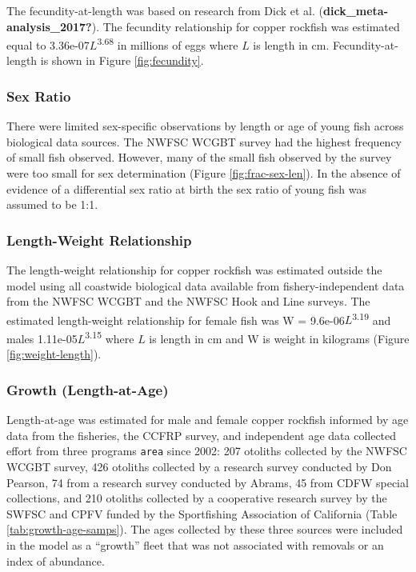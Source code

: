 \documentclass[11pt,
  english,
  letterpaper,
]{article}
\begin{document}
The fecundity-at-length was based on research from Dick et al. (\textbf{dick\_meta-analysis\_2017?}). The fecundity relationship for copper rockfish was estimated equal to 3.36e-07\(L\)\textsuperscript{3.68} in millions of eggs where \(L\) is length in cm. Fecundity-at-length is shown in Figure \ref{fig:fecundity}.

\hypertarget{sex-ratio}{%
\subsubsection{Sex Ratio}\label{sex-ratio}}

There were limited sex-specific observations by length or age of young fish across biological data sources. The NWFSC WCGBT survey had the highest frequency of small fish observed. However, many of the small fish observed by the survey were too small for sex determination (Figure \ref{fig:frac-sex-len}). In the absence of evidence of a differential sex ratio at birth the sex ratio of young fish was assumed to be 1:1.

\hypertarget{length-weight-relationship}{%
\subsubsection{Length-Weight Relationship}\label{length-weight-relationship}}

The length-weight relationship for copper rockfish was estimated outside the model using all coastwide biological data available from fishery-independent data from the NWFSC WCGBT and the NWFSC Hook and Line surveys. The estimated length-weight relationship for female fish was W = 9.6e-06\(L\)\textsuperscript{3.19} and males 1.11e-05\(L\)\textsuperscript{3.15} where \(L\) is length in cm and W is weight in kilograms (Figure \ref{fig:weight-length}).

\hypertarget{length-at-age}{%
\subsubsection{Growth (Length-at-Age)}\label{length-at-age}}

Length-at-age was estimated for male and female copper rockfish informed by age data from the fisheries, the CCFRP survey, and independent age data collected effort from three programs \texttt{area} since 2002: 207 otoliths collected by the NWFSC WCGBT survey, 426 otoliths collected by a research survey conducted by Don Pearson, 74 from a research survey conducted by Abrams, 45 from CDFW special collections, and 210 otoliths collected by a cooperative research survey by the SWFSC and CPFV funded by the Sportfishing Association of California (Table \ref{tab:growth-age-samps}). The ages collected by these three sources were included in the model as a ``growth'' fleet that was not associated with removals or an index of abundance.
\end{document}
